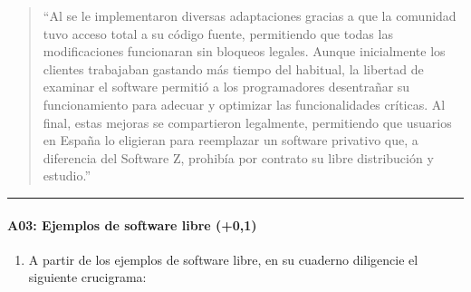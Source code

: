 \documentclass[letterpaper,10pt,spanish]{sphinxmanual}
\begin{document}
\begin{enumerate}
\begin{quote}
\sphinxAtStartPar
“Al  se le implementaron diversas adaptaciones gracias a que la comunidad tuvo acceso total a su código fuente, permitiendo que todas las modificaciones funcionaran sin bloqueos legales. Aunque inicialmente los clientes trabajaban gastando más tiempo del habitual, la libertad de examinar el software permitió a los programadores desentrañar su funcionamiento para adecuar y optimizar las funcionalidades críticas. Al final, estas mejoras se compartieron legalmente, permitiendo que usuarios en España lo eligieran para reemplazar un software privativo que, a diferencia del Software Z, prohibía por contrato su libre distribución y estudio.”
\end{quote}

\end{enumerate}


\bigskip\hrule\bigskip



\paragraph{A03: Ejemplos de software libre (+0,1)}
\label{\detokenize{cursos/ofimatica10/periodo01/G02:a03-ejemplos-de-software-libre-0-1}}
\sphinxAtStartPar
{}
\begin{enumerate}
%
\item {} 
\sphinxAtStartPar
A partir de los ejemplos de software libre, en su cuaderno diligencie el siguiente crucigrama:

\end{enumerate}
\end{document}
